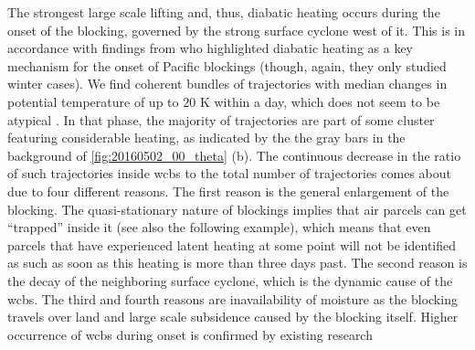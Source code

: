 The strongest large scale lifting and, thus, diabatic heating occurs during the onset of the blocking, governed by the strong surface cyclone west of it. This is in accordance with findings from \textcite{millerNorthernHemisphereWinter2022} who highlighted diabatic heating as a key mechanism for the onset of Pacific blockings (though, again, they only studied winter cases). We find coherent bundles of trajectories with median changes in potential temperature of up to $20$ K within a day, which does not seem to be atypical \parencite[e.g.,~][]{madonnaWarmConveyorBelts2014a}. In that phase, the majority of trajectories are part of some cluster featuring considerable heating, as indicated by the the gray bars in the background of \cref{fig:20160502_00_theta} (b). The continuous decrease in the ratio of such trajectories inside \glspl{wcb} to the total number of trajectories comes about due to four different reasons. The first reason is the general enlargement of the blocking. The quasi-stationary nature of blockings implies that air parcels can get \enquote{trapped} inside it (see also the following example), which means that even parcels that have experienced latent heating at some point will not be identified as such as soon as this heating is more than three days past. The second reason is the decay of the neighboring surface cyclone, which is the dynamic cause of the \glspl{wcb}. The third and fourth reasons are inavailability of moisture as the blocking travels over land and large scale subsidence caused by the blocking itself. Higher occurrence of \glspl{wcb} during onset is confirmed by existing research \parencite{steinfeldRoleLatentHeating2019, hauserHolisticUnderstandingBlocked2023}

